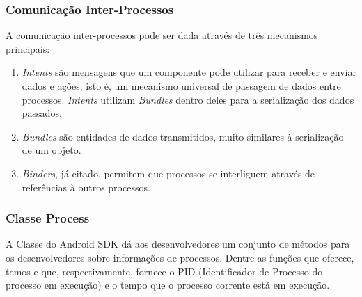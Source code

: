 \documentclass[12pt, a4paper]{article}
\newcommand{\tit}[1]{\textit{#1}}
\begin{document}
    \subsubsection{Comunicação Inter-Processos}
    A comunicação inter-processos pode ser dada através de três mecanismos principais:\cite{stack:ipc}
    \begin{enumerate}
        \item \tit{Intents} são mensagens que um componente pode utilizar para receber e enviar dados e ações, isto é, um mecanismo universal de passagem de dados entre processos. \tit{Intents} utilizam \tit{Bundles} dentro deles para a serialização dos dados passados.\cite{android:intent}
        \item \tit{Bundles} são entidades de dados transmitidos, muito similares à serialização de um objeto.\cite{android:bundle}
        \item \tit{Binders}, já citado, permitem que processos se interliguem através de referências à outros processos.\cite{android:ibinder}
    \end{enumerate}
    
    \subsubsection{Classe Process}
    A Classe  do Android SDK dá aos desenvolvedores um conjunto de métodos para os desenvolvedores sobre informações de processos. Dentre as funções que oferece, temos  e  que, respectivamente, fornece o PID (Identificador de Processo do processo em execução) e o tempo que o processo corrente está em execução.\cite{android:process}
    
\end{document}
